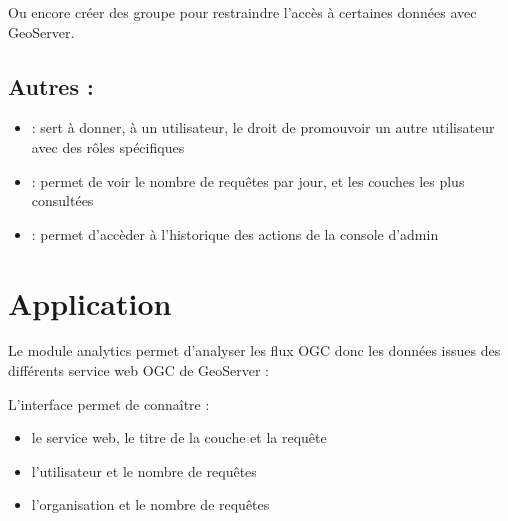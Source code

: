 \documentclass[letterpaper,10pt,french]{sphinxmanual}
\let\sphinxpxdimen\pdfpxdimen\else\newdimen\sphinxpxdimen
\begin{document}
\sphinxAtStartPar
Ou encore créer des groupe pour restraindre l’accès à certaines données avec GeoServer.


\subsection{Autres :}
\label{\detokenize{doc_admin/utilisateurs:autres}}\begin{itemize}
\item {} 
\sphinxAtStartPar
{} : sert à donner, à un utilisateur, le droit de promouvoir un autre utilisateur avec des rôles spécifiques

\item {} 
\sphinxAtStartPar
{} : permet de voir le nombre de requêtes par jour, et les couches les plus consultées

\item {} 
\sphinxAtStartPar
{} : permet d’accèder à l’historique des actions de la console d’admin

\end{itemize}

\sphinxstepscope


\section{Application}
\label{\detokenize{doc_admin/analytics:application}}\label{\detokenize{doc_admin/analytics::doc}}
\sphinxAtStartPar
Le module analytics permet d’analyser les flux OGC donc les données issues des différents service web OGC de GeoServer :

\noindent{\hspace*{\fill}\sphinxincludegraphics[width=700\sphinxpxdimen]{{ana}.png}\hspace*{\fill}}

\sphinxAtStartPar
L’interface permet de connaître :
\begin{itemize}
\item {} 
\sphinxAtStartPar
le service web, le titre de la couche et la requête

\item {} 
\sphinxAtStartPar
l’utilisateur et le nombre de requêtes

\item {} 
\sphinxAtStartPar
l’organisation et le nombre de requêtes

\end{itemize}
\end{document}
